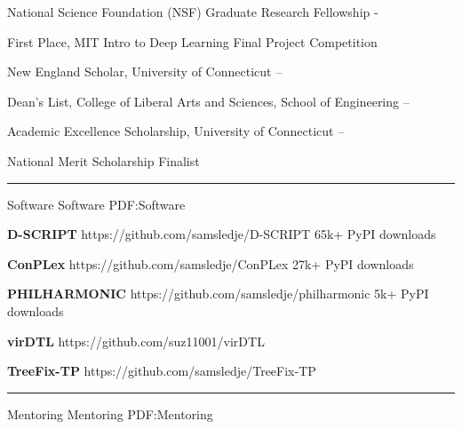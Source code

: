 \documentclass[letterpaper,MMMyyyy,nonstopmode]{simpleresumecv}
\begin{document}
\begin{Body}
\Entry
{National Science Foundation (NSF) Graduate Research Fellowship}
\hfill
{} - 
\Gap

\Entry
{First Place, MIT Intro to Deep Learning Final Project Competition}
\hfill
{}
\Gap

\Entry
{New England Scholar, University of Connecticut}
\hfill
{} -- 
\Gap

\Entry
{Dean's List, College of Liberal Arts and Sciences, School of Engineering}
\hfill
{} --
\Gap

\Entry
{Academic Excellence Scholarship, University of Connecticut}
\hfill
{} -- 
\Gap




\Entry
{National Merit Scholarship Finalist}
\hfill
{}

\BigGap
\hrule
\Section
{Software}
{Software}
{PDF:Software}

\Entry
{\textbf{D-SCRIPT}}
\hfill https://github.com/samsledje/D-SCRIPT
\Gap
\Item
65k+ PyPI downloads
\BigGap

\Entry
{\textbf{ConPLex}}
\hfill https://github.com/samsledje/ConPLex
\Gap
\Item
27k+ PyPI downloads
\BigGap

\Entry
{\textbf{PHILHARMONIC}}
\hfill https://github.com/samsledje/philharmonic
\Gap
\Item
5k+ PyPI downloads
\BigGap

\Entry
{\textbf{virDTL}}
\hfill https://github.com/suz11001/virDTL
\BigGap

\Entry
{\textbf{TreeFix-TP}}
\hfill https://github.com/samsledje/TreeFix-TP
\BigGap

\BigGap
\hrule
\Section
{Mentoring}
{Mentoring}
{PDF:Mentoring}


\end{Body}
\end{document}

